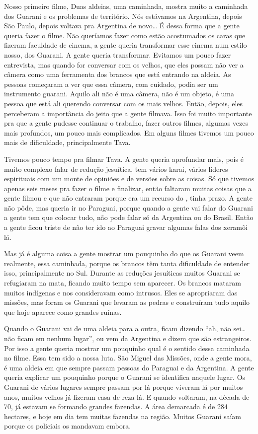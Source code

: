 Nosso primeiro filme, Duas aldeias, uma caminhada, mostra muito a
caminhada dos Guarani e os problemas de território. Nós estávamos na
Argentina, depois São Paulo, depois voltava pra Argentina de novo\ldots{} É
dessa forma que a gente queria fazer o filme. Não queríamos fazer como
estão acostumados os caras que fizeram faculdade de cinema, a gente
queria transformar esse cinema num estilo nosso, dos Guarani. A gente
queria transformar. Evitamos um pouco fazer entrevista, mas quando for
conversar com os velhos, que eles possam não ver a câmera como uma
ferramenta dos brancos que está entrando na aldeia. As pessoas
começaram a ver que essa câmera, com cuidado, podia ser um instrumento
guarani. Aquilo ali não é uma câmera, não é um objeto, é uma pessoa que
está ali querendo conversar com os mais velhos. Então, depois, eles
perceberam a importância do jeito que a gente filmava. Isso foi muito
importante pra que a gente pudesse continuar o trabalho, fazer outros
filmes, algumas vezes mais profundos, um pouco mais complicados. Em
alguns filmes tivemos um pouco mais de dificuldade, principalmente
Tava.  

Tivemos pouco tempo pra filmar Tava. A gente queria aprofundar mais,
pois é muito complexo falar de redução jesuítica, tem vários karai,
vários lideres espirituais com um monte de opiniões e de versões sobre
as coisas. Só que tivemos apenas seis meses pra fazer o filme e
finalizar, então faltaram muitas coisas que a gente filmou e que não
entraram porque era um recurso do , tinha prazo. A gente não pôde,
mas queria ir no Paraguai, porque quando a gente vai falar do Guarani a
gente tem que colocar tudo, não pode falar só da Argentina ou do
Brasil. Então a gente ficou triste de não ter ido ao Paraguai gravar
algumas falas dos xeramõi lá. 

Mas já é alguma coisa a gente mostrar um pouquinho do que os Guarani
veem realmente, essa caminhada, porque os brancos têm tanta dificuldade
de entender isso, principalmente no Sul. Durante as reduções jesuíticas
muitos Guarani se refugiaram na mata, ficando muito tempo sem
aparecer. Os brancos mataram muitos indígenas e nos consideravam como
intrusos. Eles se apropriaram das missões, mas foram os Guarani que
levaram as pedras e construíram tudo aquilo que hoje aparece como
grandes ruínas.

Quando o Guarani vai de uma aldeia para a outra, ficam dizendo ``ah, não
sei\ldots{} não ficam em nenhum lugar'', ou vem da Argentina e dizem que são
estrangeiros. Por isso a gente queria mostrar um pouquinho qual é o
sentido dessa caminhada no filme. Essa tem sido a nossa luta. São
Miguel das Missões, onde a gente mora, é uma aldeia em que sempre
passam pessoas do Paraguai e da Argentina. A gente queria explicar um
pouquinho porque o Guarani se identifica naquele lugar. Os Guarani de
vários lugares sempre passam por lá porque viveram lá por muitos anos,
muitos velhos já fizeram casa de reza lá. E quando voltaram, na década
de 70, já estavam se formando grandes fazendas. A área demarcada é de
284 hectares, e hoje em dia tem muitas fazendas na região. Muitos
Guarani saíam porque os policiais os mandavam embora.

